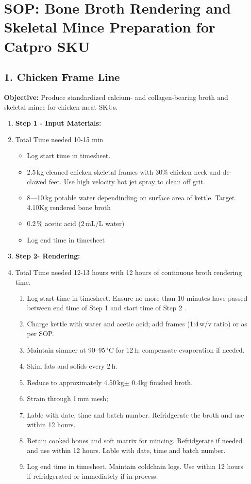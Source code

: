 \section*{SOP: Bone Broth Rendering and Skeletal Mince Preparation for Catpro SKU}

\subsection*{1. Chicken Frame Line}
\textbf{Objective:} Produce standardized calcium- and collagen-bearing broth and skeletal mince for chicken meat SKUs.

\begin{enumerate}
  \item \textbf{Step 1 -  Input Materials:}
    \item Total Time needed 10-15 min 
    \begin{itemize} 
     \item  Log start time in timesheet. 
      \item 2.5\,kg cleaned chicken skeletal frames with 30\% chicken neck and de-clawed feet. Use high velocity hot jet spray to clean off grit. 
      \item 8---10\,kg potable water dependinding on surface area of kettle. Target 4.10Kg rendered bone broth
      \item 0.2\,\% acetic acid (2\,mL/L water)
      \item Log end time in timesheet
    \end{itemize}

  \item \textbf{Step 2- Rendering:}
   \item Total Time needed 12-13 hours with 12 hours of continuous broth rendering time. 
    \begin{enumerate}
      \item Log start time in timesheet. Ensure no more than 10 minutes have passed between end time of Step 1 and start time of Step 2 .
      \item Charge kettle with water and acetic acid; add frames (1:4\,w/v ratio) or as per SOP.
      \item Maintain simmer at 90–95\,$^{\circ}$C for 12\,h; compensate evaporation if needed.
      \item Skim fats and solids every 2\,h.
      \item Reduce to approximately 4.50\,kg$\pm$ 0.4kg finished broth. 
      \item Strain through 1\,mm mesh; 
      \item Lable with date, time and batch number. Refridgerate the broth and use within 12 hours. 
      \item Retain cooked bones and soft matrix for mincing. Refridgerate if needed and use within 12 hours. Lable with date, time and batch number.
      \item Log end time in timesheet. Maintain coldchain logs. Use within 12 hours if refridgerated or immediately if in process. 
    \end{enumerate}


\end{enumerate}
